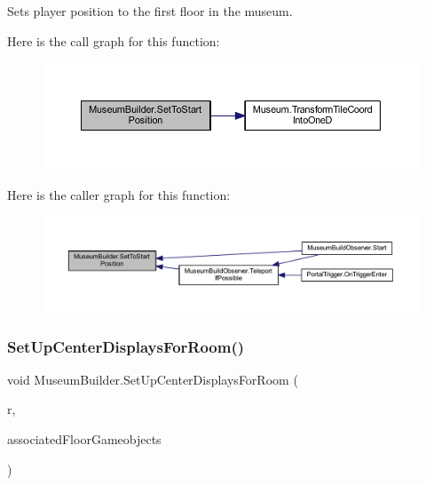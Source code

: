 Sets player position to the first floor in the museum. 

Here is the call graph for this function\+:
\nopagebreak
\begin{figure}[H]
\begin{center}
\leavevmode
\includegraphics[width=350pt]{class_museum_builder_a875e7252e31ad7ae28f17eb365ef5ce5_cgraph}
\end{center}
\end{figure}
Here is the caller graph for this function\+:
\nopagebreak
\begin{figure}[H]
\begin{center}
\leavevmode
\includegraphics[width=350pt]{class_museum_builder_a875e7252e31ad7ae28f17eb365ef5ce5_icgraph}
\end{center}
\end{figure}
\mbox{\label{class_museum_builder_a159e037415aaf348d5a0af9561be8560}} 
\subsubsection{\texorpdfstring{Set\+Up\+Center\+Displays\+For\+Room()}{SetUpCenterDisplaysForRoom()}}
{\footnotesize\ttfamily void Museum\+Builder.\+Set\+Up\+Center\+Displays\+For\+Room (\begin{DoxyParamCaption}\item[{\mbox{\hyperlink{class_room}{Room}}}]{r,  }\item[{List$<$ Game\+Object $>$}]{associated\+Floor\+Gameobjects }\end{DoxyParamCaption})\hspace{0.3cm}{\ttfamily [private]}}



